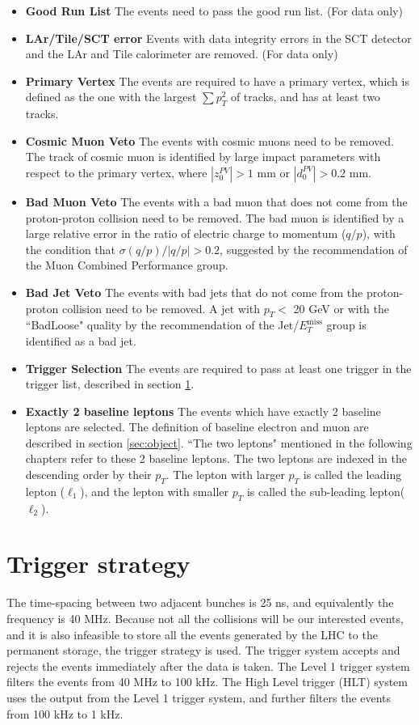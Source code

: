 \begin{itemize}
\item \textbf{Good Run List} The events need to pass the good run list. (For data only)
\item \textbf{LAr/Tile/SCT error} Events with data integrity errors in the SCT detector and the LAr and Tile calorimeter are removed. (For data only)
\item \textbf{Primary Vertex} The events are required to have a primary vertex, which is defined as the one with the largest $\sum p_{T}^{2}$ of tracks, and has at least two tracks.
\item \textbf{Cosmic Muon Veto} The events with cosmic muons need to be removed. The track of cosmic muon is identified by large impact parameters with respect to the primary vertex, where $|z_{0}^{PV}|>1$ mm or $|d_{0}^{PV}|>0.2$ mm.
\item \textbf{Bad Muon Veto} The events with a bad muon that does not come from the proton-proton collision need to be removed. The bad muon is identified by a large relative error in the ratio of electric charge to momentum ($q/p$), with the condition that $\sigma(q/p) / |q/p| > 0.2$, suggested by the recommendation of the Muon Combined Performance group. \cite{muons}
\item \textbf{Bad Jet Veto} The events with bad jets that do not come from the proton-proton collision need to be removed. A jet with $p_{T}<$ 20 GeV or with the ``BadLoose" quality by the recommendation of the Jet/$E_T^{\text{miss}}$ group \cite{jet_cleaning} is identified as a bad jet.
\item \textbf{Trigger Selection} The events are required to pass at least one trigger in the trigger list, described in section \ref{sec:trigger}.
\item \textbf{Exactly 2 baseline leptons} The events which have exactly 2 baseline leptons are selected. The definition of baseline electron and muon are described in section \ref{sec:object}. ``The two leptons" mentioned in the following chapters refer to these 2 baseline leptons. The two leptons are indexed in the descending order by their $p_T$. The lepton with larger $p_T$ is called the leading lepton ($\ell_1$), and the lepton with smaller $p_T$ is called the sub-leading lepton($\ell_2$).
\end{itemize}

\section{Trigger strategy}
\label{sec:trigger}
The time-spacing between two adjacent bunches is 25 ns, and equivalently the frequency is 40 MHz.
Because not all the collisions will be our interested events, and it is also infeasible to store all the events generated by the LHC to the permanent storage, the trigger strategy is used.
The trigger system accepts and rejects the events immediately after the data is taken.
The Level 1 trigger system filters the events from 40 MHz to 100 kHz.
The High Level trigger (HLT) system uses the output from the Level 1 trigger system, and further filters the events from 100 kHz to 1 kHz.

